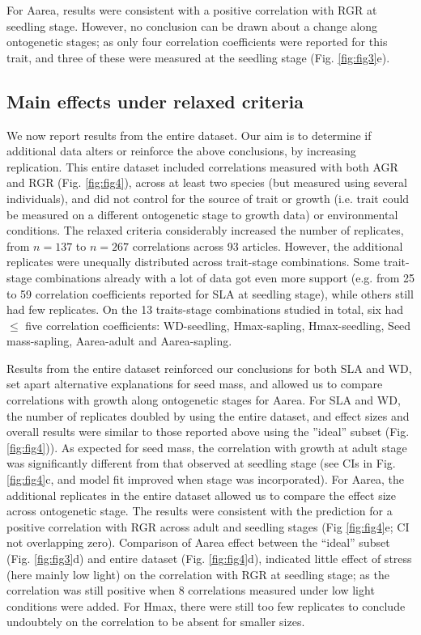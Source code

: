 \documentclass[a4paper,11pt]{article}
\begin{document}
For Aarea, results were consistent with a positive correlation with RGR at seedling stage. However, no conclusion can be drawn about a change along ontogenetic stages; as only four correlation coefficients were reported for this trait, and three of these were measured at the seedling stage (Fig. \ref{fig:fig3}e).


\subsection*{Main effects under relaxed criteria}

We now report results from the entire dataset. Our aim is to determine if additional data alters or reinforce the above conclusions, by increasing replication. This entire dataset included correlations measured with both AGR and RGR (Fig. \ref{fig:fig4}), across at least two species (but measured using several individuals), and did not control for the source of trait or growth (i.e. trait could be measured on a different ontogenetic stage to growth data) or environmental conditions. The relaxed criteria considerably increased the number of replicates, from $n = 137$ to $n = 267$ correlations across 93 articles. However, the additional replicates were unequally distributed across trait-stage combinations. Some trait-stage combinations already with a lot of data got even more support (e.g. from 25 to 59 correlation coefficients reported for SLA at seedling stage), while others still had few replicates. On the 13 traits-stage combinations studied in total, six had $\le$ five correlation coefficients: WD-seedling, Hmax-sapling, Hmax-seedling, Seed mass-sapling, Aarea-adult and Aarea-sapling.


Results from the entire dataset reinforced our conclusions for both SLA and WD, set apart alternative explanations for seed mass, and allowed us to compare correlations with growth along ontogenetic stages for Aarea. For SLA and WD, the number of replicates doubled by using the entire dataset, and effect sizes and overall results were similar to those reported above using the ''ideal'' subset (Fig. \ref{fig:fig4})). As expected for seed mass, the correlation with growth at adult stage was significantly different from that observed at seedling stage (see CIs in Fig. \ref{fig:fig4}c, and model fit improved when stage was incorporated). For Aarea, the additional replicates in the entire dataset allowed us to compare the effect size across ontogenetic stage. The results were consistent with the prediction for a positive correlation with RGR across adult and seedling stages (Fig \ref{fig:fig4}e; CI not overlapping zero). Comparison of Aarea effect between the ``ideal'' subset (Fig. \ref{fig:fig3}d) and entire dataset (Fig. \ref{fig:fig4}d), indicated little effect of stress (here mainly low light) on the correlation with RGR at seedling stage; as the correlation was still positive when 8 correlations measured under low light conditions were added. For Hmax, there were still too few replicates to conclude undoubtely on the correlation to be absent for smaller sizes.
\end{document}
